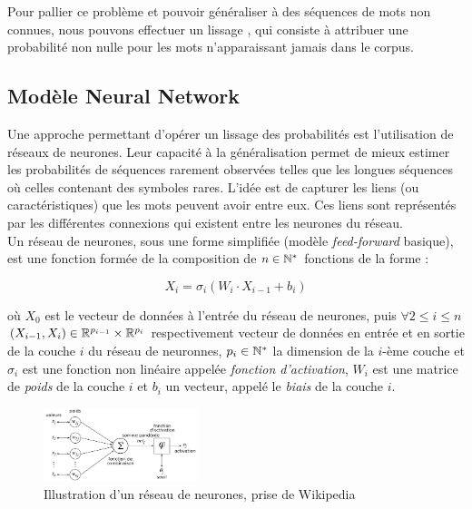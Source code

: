 Pour pallier ce problème et pouvoir généraliser à des séquences de mots non connues, nous pouvons effectuer un \og lissage \fg{}, qui consiste à attribuer une probabilité non nulle pour les mots n'apparaissant jamais dans le corpus.

\subsection{Modèle Neural Network}

Une approche permettant d'opérer un lissage des probabilités est l'utilisation de réseaux de neurones.
Leur capacité à la généralisation permet de mieux estimer les probabilités de séquences rarement observées telles que les longues séquences où celles contenant des symboles rares.
L'idée est de capturer les liens (ou caractéristiques) que les mots peuvent avoir entre eux. Ces liens sont représentés par les différentes connexions qui existent entre les neurones du réseau. \\

Un réseau de neurones, sous une forme simplifiée (modèle \textit{feed-forward} basique), est une fonction formée de la composition de $n \in \mathbb{N}^*$ fonctions de la forme :

\[ X_i = \sigma_i(W_i\cdot X_{i-1} + b_i) \]

où $X_0$ est le vecteur de données à l'entrée du réseau de neurones, puis $\forall 2 \leq i \leq n$ $(X_{i-1}, X_i) \in \mathbb{R}^{p_{i-1}}\times \mathbb{R}^{p_i}$ respectivement vecteur de données en entrée et en sortie de la couche $i$ du réseau de neuronnes, ${p_i} \in \mathbb{N}^*$ la dimension de la $i$-ème couche et $\sigma_i$ est une fonction non linéaire appelée \textit{fonction d'activation}, $W_i$ est une matrice de \textit{poids}
de la couche $i$ et $b_i$ un vecteur, appelé le \textit{biais} de la couche $i$. \\


\begin{figure}[h!]
\begin{center}
  \includegraphics[width=0.4\textwidth]{img/NN.png}
  \caption{Illustration d'un réseau de neurones, prise de Wikipedia}
\end{center}
\end{figure}

